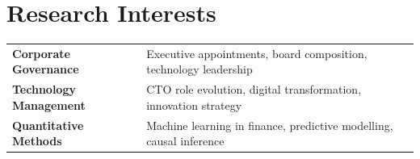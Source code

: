 \section{Research Interests}
\begin{tabularx}{\linewidth}{@{}l X@{}}
\textbf{Corporate Governance} & Executive appointments, board composition, technology leadership \\
\textbf{Technology Management} & CTO role evolution, digital transformation, innovation strategy \\
\textbf{Quantitative Methods} & Machine learning in finance, predictive modelling, causal inference \\
\end{tabularx}
